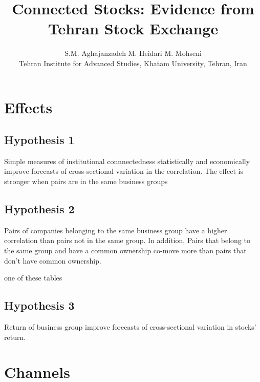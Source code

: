 \documentclass[12pt, a4paper]{article}
\title{Connected Stocks: Evidence from Tehran Stock Exchange}
\author{S.M. Aghajanzadeh\sym{*} \qquad M. Heidari\sym{*} \qquad M. Mohseni\sym{*} \\
	\sym{*} \footnotesize  Tehran Institute for Advanced Studies, Khatam University, Tehran, Iran
}
\begin{document}
	\maketitle
\section*{Effects}
\subsection*{\textbf{Hypothesis 1}}
 Simple measures of institutional connnectedness statistically and economically improve forecasts of cross-sectional variation in the correlation. The effect is stronger when pairs are in the same business groups

		\begin{table}[htbp]
	\centering
	\resizebox{\textwidth}{!}{
		
	}
\end{table}

	\FloatBarrier
	\newpage
	
\subsection*{\textbf{Hypothesis 2}}
 Pairs of companies belonging to the same business group have a higher correlation than pairs not in the same group. In addition, Pairs that belong to the same group and have a common ownership co-move more than pairs that don't have common ownership. 
		\begin{table}[htbp]
	\centering
	\caption{one of these tables}
	\resizebox{\textwidth}{!}{
		
	}
\newline
\resizebox{\textwidth}{!}{
	
}
\end{table}

\newpage
\subsection*{\textbf{Hypothesis 3}} 
Return of business group improve forecasts of cross-sectional variation in stocks' return.

			\begin{table}[htbp]
		\centering
		\resizebox{\textwidth}{!}{
			
		}
	\end{table}


\newpage

\section*{Channels} 
\end{document}
